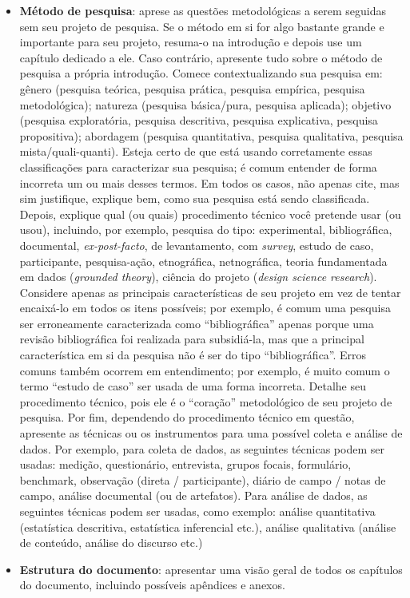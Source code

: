 \documentclass[
	12pt,				%
	oneside,			%
	a4paper,			%
	english,			%
	brazil				%
	]{abntex2ppgsi}
\begin{document}
\begin{itemize}
	\item \textbf{Método de pesquisa}: aprese as questões metodológicas a serem seguidas sem seu projeto de pesquisa. Se o método em si for algo bastante grande e importante para seu projeto, resuma-o na introdução e depois use um capítulo dedicado a ele. Caso contrário, apresente tudo sobre o método de pesquisa a própria introdução. Comece contextualizando sua pesquisa em: gênero (pesquisa teórica, pesquisa prática, pesquisa empírica, pesquisa metodológica); natureza (pesquisa básica/pura, pesquisa aplicada); objetivo (pesquisa exploratória, pesquisa descritiva, pesquisa explicativa, pesquisa propositiva); abordagem (pesquisa quantitativa, pesquisa qualitativa, pesquisa mista/quali-quanti). Esteja certo de que está usando corretamente essas classificações para caracterizar sua pesquisa; é comum entender de forma incorreta um ou mais desses termos. Em todos os casos, não apenas cite, mas sim justifique, explique bem, como sua pesquisa está sendo classificada. Depois, explique qual (ou quais) procedimento técnico você pretende usar (ou usou), incluindo, por exemplo, pesquisa do tipo: experimental, bibliográfica, documental, \textit{ex-post-facto}, de levantamento, com \textit{survey}, estudo de caso, participante, pesquisa-ação, etnográfica, netnográfica, teoria fundamentada em dados (\textit{grounded theory}), ciência do projeto (\textit{design science research}). Considere apenas as principais características de seu projeto em vez de tentar encaixá-lo em todos os itens possíveis; por exemplo, é comum uma pesquisa ser erroneamente caracterizada como ``bibliográfica'' apenas porque uma revisão bibliográfica foi realizada para subsidiá-la, mas que a principal característica em si da pesquisa não é ser do tipo ``bibliográfica''. Erros comuns também ocorrem em entendimento; por exemplo, é muito comum o termo ``estudo de caso'' ser usada de uma forma incorreta. Detalhe seu procedimento técnico, pois ele é o ``coração'' metodológico de seu projeto de pesquisa. Por fim, dependendo do procedimento técnico em questão, apresente as técnicas ou os instrumentos para uma possível coleta e análise de dados. Por exemplo, para coleta de dados, as seguintes técnicas podem ser usadas: medição, questionário, entrevista, grupos focais, formulário, benchmark, observação (direta / participante), diário de campo / notas de campo, análise documental (ou de artefatos). Para análise de dados, as seguintes técnicas podem ser usadas, como exemplo: análise quantitativa (estatística descritiva, estatística inferencial etc.), análise qualitativa (análise de conteúdo, análise do discurso etc.)
	\item \textbf{Estrutura do documento}: apresentar uma visão geral de todos os capítulos do documento, incluindo possíveis apêndices e anexos.
\end{itemize}
\end{document}
